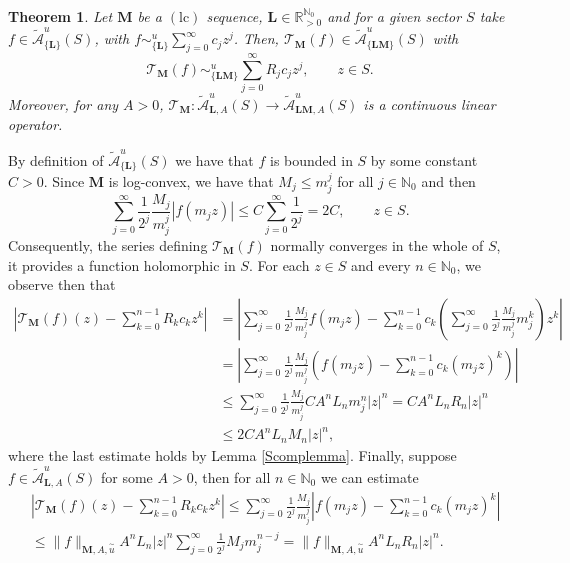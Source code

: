 \documentclass[11pt,a4paper]{article}
\theoremstyle{plain}
\newtheorem{theorem}[proposition]{Theorem}
\theoremstyle{definition}
\newcommand{\RR}{\mathbb{R}}
\newcommand{\NN}{\mathbb{N}}
\newcommand{\M}{\mathbf{M}}
\newcommand{\LL}{\mathbf{L}}
\begin{document}
\begin{theorem}\label{CharacteristicTransformUniformAsymptotic}
        Let $\M$ be a \hyperlink{lc}{$(\text{lc})$} sequence, $\LL\in\RR_{>0}^{\NN_0}$ and for a given sector $S$ take $f\in\widetilde{\mathcal{A}}^u_{\{\LL\}} (S)$,  with $f\sim^u_{\{\LL\}}\sum_{j=0}^\infty c_j z^j$. Then, $\mathcal{T}_{\M} (f)\in \widetilde{\mathcal{A}}^u_{\{\LL\M\}} (S)$  with 
        \begin{equation}\label{eq.CoeffT_Mf}
        	\mathcal{T}_{\M} (f)\sim^u_{\{\LL\M\}} \sum_{j=0}^{\infty}R_jc_j z^j,\qquad z\in S.
        \end{equation}
        Moreover, for any $A>0$, $\mathcal{T}_{\M} : \widetilde{\mathcal{A}}^u_{\LL, A} (S)\rightarrow\widetilde{\mathcal{A}}^u_{\LL\M, A } (S)$ is a continuous linear operator.
\end{theorem}
%
By definition of $\widetilde{\mathcal{A}}^u_{\{\LL\}} (S)$ we have that $f$ is bounded in $S$ by some constant $C>0$. Since $\M$ is log-convex, we have that $M_j\le m_j^j$ for all $j\in\NN_0$ and then
$$\sum_{j=0}^{\infty}\frac{1}{2^j} \frac{M_j}{m_j^j} \left|f(m_j z) \right| \leq  C  \sum_{j=0}^{\infty}\frac{1}{2^j}=2C, \qquad z\in S.$$
Consequently, the series defining $\mathcal{T}_{\M} (f)$ normally converges in the whole of $S$, it provides a function holomorphic in $S$.
For each $z\in S$ and every $n\in\NN_0$, we observe then that
\begin{align*}
	\left|\mathcal{T}_{\M} (f) (z) -  \sum_{k=0}^{n-1} R_kc_k z^k\right|&= \left|\sum_{j=0}^{\infty}\frac{1}{2^j} \frac{M_j}{m_j^j} f(m_j z) -  \sum_{k=0}^{n-1} c_k  (\sum^{\infty}_{j=0} \frac{1}{2^j} \frac{M_j}{m_j^j}m_j^k)  z^k\right|
	\\&
	=\left|\sum_{j=0}^{\infty}\frac{1}{2^j} \frac{M_j}{m_j^j}  \left(f(m_j z) -  \sum_{k=0}^{n-1} c_k   (m_jz)^k\right)\right|
	\\&
	\le\sum_{j=0}^{\infty}\frac{1}{2^j}\frac{M_j}{m_j^j}C A^n L_n m_j^n |z|^n= C A^n L_n R_n |z|^n
	\\&
	\le 2 C A^n L_n M_n |z|^n,
\end{align*}
where the last estimate holds by Lemma \ref{Scomplemma}.
Finally, suppose $f\in \widetilde{\mathcal{A}}^u_{\LL,A} (S)$ for some $A>0$, then for all $n\in\NN_0$ we can estimate
\begin{align*}
	&\left|\mathcal{T}_{\M} (f) (z) -  \sum_{k=0}^{n-1} R_kc_k z^k\right|\leq \sum_{j=0}^{\infty}\frac{1}{2^j} \frac{M_j}{m_j^j}  \left|f(m_j z) -  \sum_{k=0}^{n-1} c_k   (m_jz)^k\right|
	\\&
	\le \|f\|_{\M,A,\overset{\sim}{u}} A^n L_n|z|^n \sum_{j=0}^{\infty}\frac{1}{2^j}M_jm_j^{n-j}=\|f\|_{\M,A,\overset{\sim}{u}} A^n L_n R_n|z|^n.
\end{align*}
\end{document}
